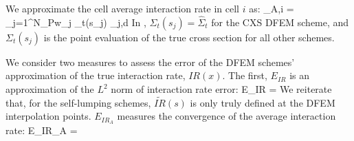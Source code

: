 We approximate the cell average interaction rate in cell $i$ as:
\benum
\label{eq:chap3_ia_calc}
_{A,i} = \sum_{j=1}^{N_P}{w_j \Sigma_t(s_j) \psi_{j,d} }\pep
\eenum
In , $\Sigma_t(s_j) = \hat{\Sigma}_t$ for the CXS DFEM scheme, and $\Sigma_t(s_j)$ is the point evaluation of the true cross section for all other schemes.

We consider two measures to assess the error of the DFEM schemes' approximation of the true interaction rate, $IR(x)$.  The first, $E_{IR}$ is an approximation of the $L^2$ norm of interaction rate error:
\benum
E_{IR} =  \pep
\label{eq:chap3_EIR}
\eenum
We reiterate that, for the self-lumping schemes, $\widetilde{IR}(s)$ is only truly defined at the DFEM interpolation points.
$E_{IR_A}$ measures the convergence of the average interaction rate:
\benum
E_{IR_A} =  \pep
\eenum

